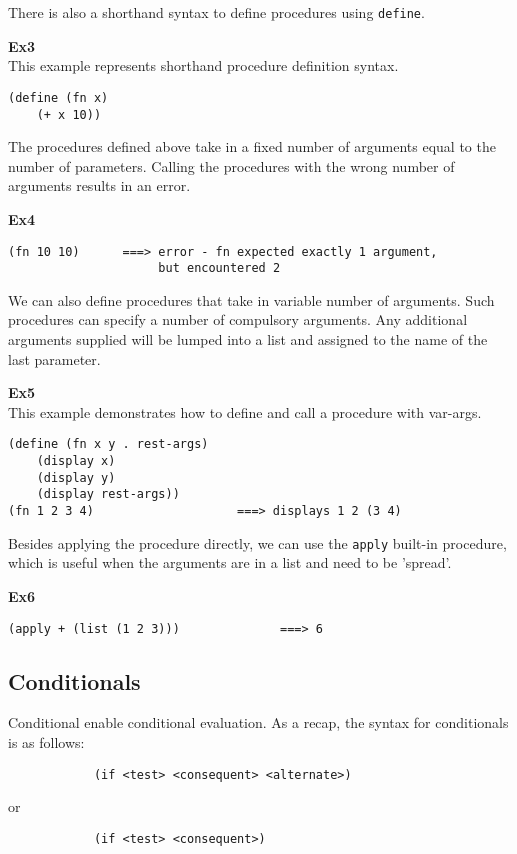 \documentclass{article}
\begin{document}
There is also a shorthand syntax to define procedures using \texttt{define}.

\textbf{Ex3}\\
This example represents shorthand procedure definition syntax.
\begin{lstlisting}
(define (fn x)
    (+ x 10))
\end{lstlisting}

The procedures defined above take in a fixed number of arguments equal to the number of parameters.
Calling the procedures with the wrong number of arguments results in an error.

\textbf{Ex4}\\
\begin{lstlisting}
(fn 10 10)      ===> error - fn expected exactly 1 argument,
                     but encountered 2
\end{lstlisting}

We can also define procedures that take in variable number of arguments. Such procedures can specify a number of compulsory arguments. Any additional arguments supplied will be lumped into a list and assigned to the name of the last parameter.

\textbf{Ex5}\\
This example demonstrates how to define and call a procedure with var-args.
\begin{lstlisting}
(define (fn x y . rest-args)
    (display x)
    (display y)
    (display rest-args))
(fn 1 2 3 4)                    ===> displays 1 2 (3 4)
\end{lstlisting}

Besides applying the procedure directly, we can use the \texttt{apply} built-in procedure, which is useful when the arguments are in a list and need to be 'spread'.

\textbf{Ex6}\\
\begin{lstlisting}
(apply + (list (1 2 3)))              ===> 6
\end{lstlisting}


\subsection*{Conditionals}
Conditional enable conditional evaluation. As a recap, the syntax for conditionals is as follows:

\begin{lstlisting}
            (if <test> <consequent> <alternate>)
\end{lstlisting}
or
\begin{lstlisting}
            (if <test> <consequent>)
\end{lstlisting}
\end{document}
